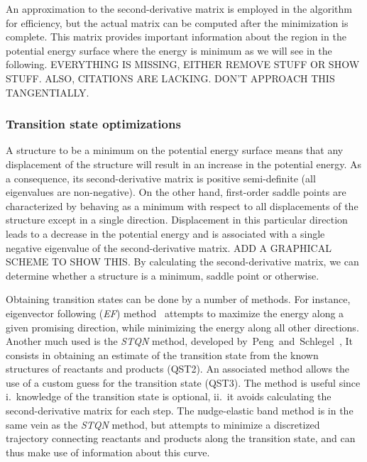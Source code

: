 An approximation to the second-derivative matrix is employed in the algorithm
for efficiency,
but the actual matrix can be computed after the minimization is
complete.
This matrix provides important information about the region in the potential
energy surface where the energy is minimum as we will see in the following.
EVERYTHING IS MISSING,
EITHER REMOVE STUFF OR SHOW STUFF.\@
ALSO,
CITATIONS ARE LACKING.\@
DON'T APPROACH THIS TANGENTIALLY.\@

\subsubsection{Transition state optimizations}%
\label{sec:ts-optimizations}

A structure to be a minimum on the potential energy surface means that any
displacement of the structure will result in an increase in the potential
energy.
As a consequence,
its second-derivative matrix
is positive semi-definite (all eigenvalues are non-negative).
On the other hand,
first-order saddle points are characterized by behaving as
a minimum with respect to all displacements of the structure except in a single
direction.
Displacement in this particular direction leads to a decrease in the potential
energy and is associated with a single negative eigenvalue of the
second-derivative matrix.
ADD A GRAPHICAL SCHEME TO SHOW THIS.\@
By calculating the second-derivative matrix,
we can determine whether a structure
is a minimum,
saddle point or otherwise.

Obtaining transition states can be done by a number of methods.
For instance,
eigenvector following (\emph{EF})
method~\cite{Banerjee_1985,Schlegel_1987,Mauro_2005}
attempts to maximize the energy along a given promising direction,
while
minimizing the energy along all other directions.
Another much used is the \emph{STQN} method,
developed
by~Peng~and~Schlegel~\cite{Peng_1993,Peng_1996},
It consists in obtaining an estimate of the transition state from the known
structures of reactants and products (QST2).
An associated method allows the use of a custom guess for the transition state
(QST3).
The method is useful since
i.\ knowledge of the transition state is optional,
ii.\ it avoids calculating the second-derivative matrix for each step.
The nudge-elastic band method is in the same vein as the \emph{STQN} method,
but attempts to minimize a discretized trajectory connecting reactants and
products along the transition state,
and can thus make use of information about
this curve.

